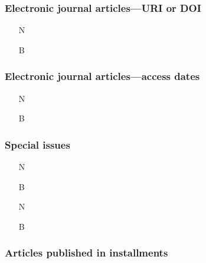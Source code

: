 \documentclass[11pt,letterpaper,oneside]{article}
\begin{document}
\setcounter{subsubsection}{183}
\subsubsection{Electronic journal articles---URI or DOI}

\begin{itemize}
\item[N] 

\item[B] 
\end{itemize}

\subsubsection{Electronic journal articles---access dates}

\begin{itemize}
\item[N] 

\item[B] 
\end{itemize}

\setcounter{subsubsection}{186}
\subsubsection{Special issues}
\label{14.187}


\begin{itemize}
\item[N] 

\item[B] 

\item[N] 

\item[B] 
\end{itemize}

\setcounter{subsubsection}{188}
\subsubsection{Articles published in installments}
\end{document}
